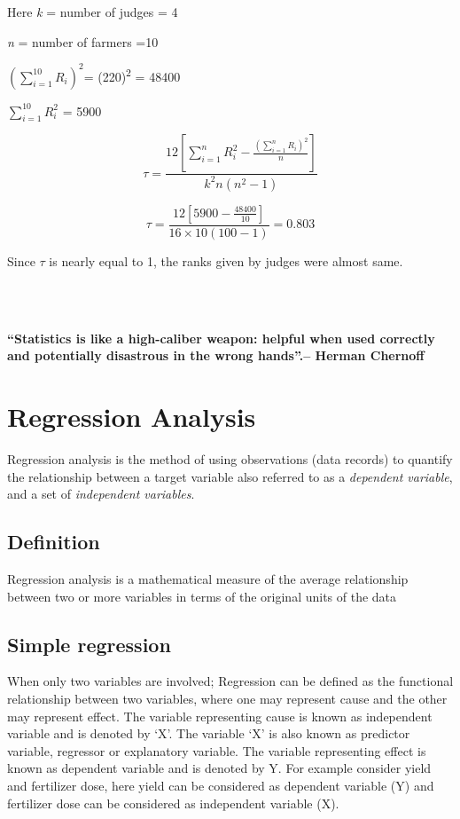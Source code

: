 \documentclass[
]{book}
\begin{document}
Here \emph{k} = number of judges = 4

\emph{n} = number of farmers =10

\(\left( \sum_{i = 1}^{10}R_{i} \right)^{2}\)= (220)\textsuperscript{2} = 48400

\(\sum_{i = 1}^{10}R_{i}^{2}\) = 5900

\[\tau = \frac{12\left\lbrack \sum_{i = 1}^{n}{R_{i}^{2} - \frac{\left( \sum_{i = 1}^{n}R_{i} \right)^{2}}{n}} \right\rbrack}{k^{2}n\left( n^{2} - 1 \right)}\]

\[\tau = \frac{12\left\lbrack 5900 - \frac{48400}{10} \right\rbrack}{16 \times 10\left( 100 - 1 \right)} = 0.803\]

Since \(\tau\) is nearly equal to 1, the ranks given by judges were almost
same.

~\\
\hspace*{0.333em}\\
\hspace*{0.333em}

\hypertarget{hello}{}
\textbf{``Statistics is like a high-caliber weapon: helpful when used
correctly and potentially disastrous in the wrong hands''.-- Herman
Chernoff}

\hypertarget{regression-analysis}{%
\chapter{Regression Analysis}\label{regression-analysis}}

Regression analysis is the method of using observations (data records)
to quantify the relationship between a target variable also referred to
as a \emph{dependent variable}, and a set of \emph{independent variables}.

\hypertarget{definition}{%
\section{Definition}\label{definition}}

Regression analysis is a mathematical measure of the average
relationship between two or more variables in terms of the original
units of the data

\hypertarget{simple-regression}{%
\section{Simple regression}\label{simple-regression}}

When only two variables are involved; Regression can be defined as the
functional relationship between two variables, where one may represent
cause and the other may represent effect. The variable representing
cause is known as independent variable and is denoted by `X'. The
variable `X' is also known as predictor variable, regressor or
explanatory variable. The variable representing effect is known as
dependent variable and is denoted by Y. For example consider yield and
fertilizer dose, here yield can be considered as dependent variable (Y)
and fertilizer dose can be considered as independent variable (X).
\end{document}
